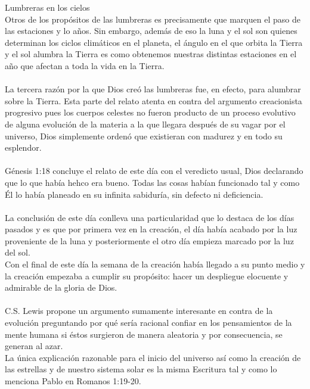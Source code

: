 \begin{section}{Lumbreras en los cielos}
	\\
	Otros de los propósitos de las lumbreras es precisamente que marquen el paso de las estaciones y lo años. Sin embargo, además de eso la luna y el sol son quienes determinan los ciclos climáticos en el planeta, el ángulo en el que orbita la Tierra y el sol alumbra la Tierra es como obtenemos nuestras distintas estaciones en el año que afectan a toda la vida en la Tierra.\\
	\\
	La tercera razón por la que Dios creó las lumbreras fue, en efecto, para alumbrar sobre la Tierra. Esta parte del relato atenta en contra del argumento creacionista progresivo pues los cuerpos celestes no fueron producto de un proceso evolutivo de alguna evolución de la materia a la que llegara después de su vagar por el universo, Dios simplemente ordenó que existieran con madurez y en todo su esplendor.\\
	\\
	Génesis 1:18 concluye el relato de este día con el veredicto usual, Dios declarando que lo que había hehco era bueno. Todas las cosas habían funcionado tal y como Él lo había planeado en su infinita sabiduría, sin defecto ni deficiencia.\\
	\\
	La conclusión de este día conlleva una particularidad que lo destaca de los días pasados y es que por primera vez en la creación, el día había acabado por la luz proveniente de la luna y posteriormente el otro día empieza marcado por la luz del sol.\\
	Con el final de este día la semana de la creación había llegado a su punto medio y la creación empezaba a cumplir su propósito: hacer un despliegue elocuente y admirable de la gloria de Dios.\\
	\\
	C.S. Lewis propone un argumento sumamente interesante en contra de la evolución preguntando por qué sería racional confiar en los pensamientos de la mente humana si éstos surgieron de manera aleatoria y por consecuencia, se generan al azar.\\
	La única explicación razonable para el inicio del universo así como la creación de las estrellas y de nuestro sistema solar es la misma Escritura tal y como lo menciona Pablo en Romanos 1:19-20.
\end{section}
\newpage
